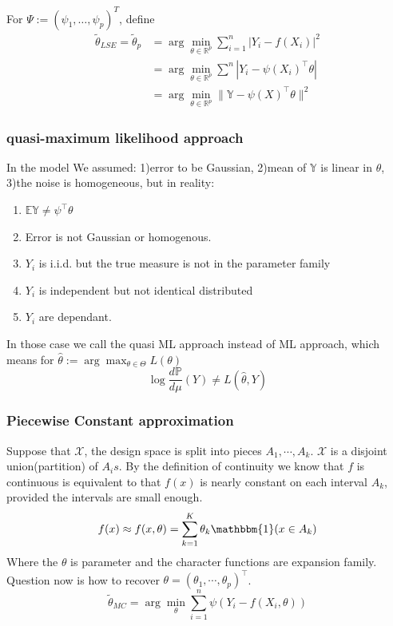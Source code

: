 \begin{method}
	For $\Psi:= (\psi_1, \dots, \psi_p)^T$, define
\begin{align*}
	\tilde{\theta}_{LSE} = \tilde{\theta}_p &= \arg \min_{\theta \in \mathbb{R}^p} \sum^n_{i = 1} | Y_i - f(X_i)|^2\\
	&= \arg \min_{\theta \in \mathbb{R}^p} \sum^n |Y_i - \psi(X_i)^\top \theta |\\
	&= \arg \min_{\theta \in \mathbb{R}^p} \| \mathbb{Y} - \psi(X)^\top \theta\|^2
\end{align*}
\end{method}


\subsubsection{quasi-maximum likelihood approach}
In the model We assumed: 1)error to be Gaussian, 2)mean of $\mathbb{Y}$ is linear in $\theta$, 3)the noise is homogeneous, but in reality: 
\begin{enumerate}
	\item $\mathbb{E}\mathbb{Y} \neq \psi^\top \theta$
	\item Error is not Gaussian or homogenous.
	\item $Y_i$ is i.i.d. but the true measure is not in the parameter family
	\item $Y_i$ is independent but not identical distributed
	\item $Y_i$ are dependant. 
\end{enumerate}
In those case we call the quasi ML approach instead of ML approach, which means for $\hat{\theta}:= \arg \max_{\theta \in \Theta} L(\theta) $
\begin{equation*}
	\log \frac{d\mathbb{P}}{d\mu}(Y) \neq L(\hat{\theta}, Y) 
\end{equation*}







\subsubsection*{Piecewise Constant approximation}
Suppose that $\mathcal{X}$, the design space is split into pieces $A_1, \cdots, A_k$. $\mathcal{X}$ is a disjoint union(partition) of $A_i s$. By the definition of continuity we know that $f$ is continuous is equivalent to that $f(x)$ is nearly constant on each interval $A_k$, provided the intervals are small enough.
\begin{equation*}
	f(x) \approx f(x, \theta) = \sum_{k = 1}^{K} \theta_k \mathbbm{1}(x \in A_k)
\end{equation*}
Where the $\theta$ is parameter and the character functions are expansion family. Question now is how to recover $\theta = (\theta_1, \cdots, \theta_p)^\top$.
\begin{equation*}
	\tilde{\theta}_{MC} = \arg \min_\theta \sum_{i = 1}^n \psi(Y_i - f(X_i, \theta))
\end{equation*}

